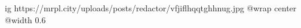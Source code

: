  
 
 
 
 

\ifcmt
  ig https://mrpl.city/uploads/posts/redactor/vfjiflhqqtghhnug.jpg
  @wrap center
  @width 0.6
\fi
